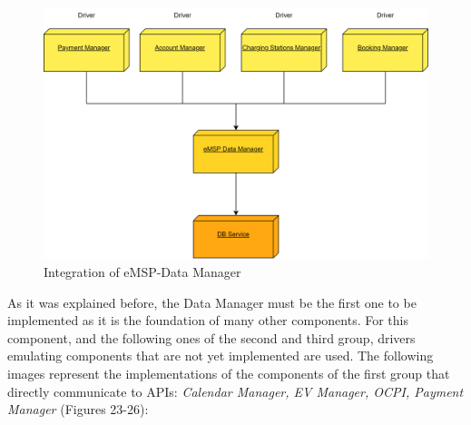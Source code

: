 \documentclass[table, 12pt]{article}
\begin{document}
\begin{figure}[H]
    \includegraphics[scale=0.6, center]{assets/Integration Diagrams/eMSP-Data Manager.png}
    \caption{Integration of eMSP-Data Manager}
    \label{fig:eMSP-Data Manager}
\end{figure}
As it was explained before, the Data Manager must be the first one to be implemented as it is the foundation of many other components. For this component, and the following ones of the second and third 
group, drivers emulating components that are not yet implemented are used. The following images represent the implementations of the components of the first group that directly communicate to APIs:
\emph{ Calendar Manager, EV Manager, OCPI, Payment Manager} (Figures 23-26):
\end{document}
